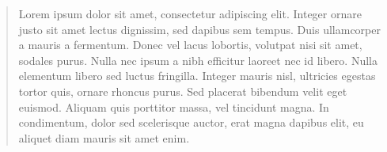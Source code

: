 
\begin{abstract}
Lorem ipsum dolor sit amet, consectetur adipiscing elit. Integer ornare justo sit amet lectus dignissim, sed dapibus sem tempus. Duis ullamcorper a mauris a fermentum. Donec vel lacus lobortis, volutpat nisi sit amet, sodales purus. Nulla nec ipsum a nibh efficitur laoreet nec id libero. Nulla elementum libero sed luctus fringilla. Integer mauris nisl, ultricies egestas tortor quis, ornare rhoncus purus. Sed placerat bibendum velit eget euismod. Aliquam quis porttitor massa, vel tincidunt magna. In condimentum, dolor sed scelerisque auctor, erat magna dapibus elit, eu aliquet diam mauris sit amet enim.
\end{abstract}
